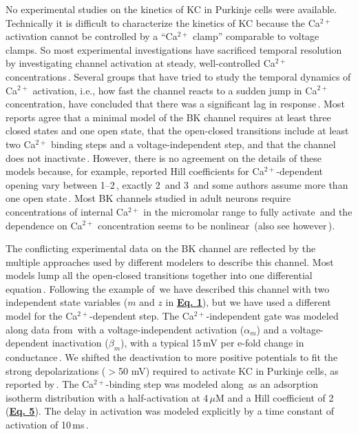 \documentclass[12pt]{article}
\begin{document}
No experimental studies on the kinetics of KC in Purkinje cells were available. Technically it is difficult to characterize the kinetics of KC because the Ca$^{2+}$ activation cannot be controlled by a ``Ca$^{2+}$ clamp'' comparable to voltage clamps. So most experimental investigations have sacrificed temporal resolution by investigating channel activation at steady, well-controlled Ca$^{2+}$ concentrations\,\cite{McManus:1898kl, Moczydlowski:1983qa, Smart:1987mi}. Several groups that have tried to study the temporal dynamics of Ca$^{2+}$ activation, i.e., how fast the channel reacts to a sudden jump in Ca$^{2+}$ concentration, have concluded that there was a significant lag in response\,\cite{Gola:1990pi, Hudspeth:1988ff, Ikemoto:1989lh, L:1989ff}. Most reports agree that a minimal model of the BK channel requires at least three closed states and one open state, that the open-closed transitions include at least two Ca$^{2+}$ binding steps and a voltage-independent step, and that the channel does not inactivate\,\cite{Gola:1990pi, Moczydlowski:1983qa, Smart:1987mi}. However, there is no agreement on the details of these models because, for example, reported Hill coefficients for Ca$^{2+}$-dependent opening vary between 1--2\,\cite{Franciolini:1988fu, Moczydlowski:1983qa}, exactly 2\,\cite{Hudspeth:1988ff, Reinhart1989:xe} and 3\,\cite{Ikemoto:1989lh} and some authors assume more than one open state\,\cite{McManus:1898kl, Smart:1987mi}. Most BK channels studied in adult neurons require concentrations of internal Ca$^{2+}$ in the micromolar range to fully activate\,\cite{Franciolini:1988fu, Lancaster:1991ye, Reinhart1989:xe, Smart:1987mi} and the dependence on Ca$^{2+}$ concentration seems to be nonlinear\,\cite{Franciolini:1988fu, Moczydlowski:1983qa} (also see however\,\cite{L:1989ff}).

The conflicting experimental data on the BK channel are reflected by the multiple approaches used by different modelers to describe this channel. Most models lump all the open-closed transitions together into one differential equation\,\cite{hines84:_effic, Moczydlowski:1983qa, D:1982lh, Yamada-W:1989bs}. Following the example of\,\cite{Traub-R-D:1991mi} we have described this channel with two independent state variables ($m$ and $z$ in \href{../pub-purkinje-deschutter1-equations1/pub-purkinje-deschutter1-equations1.tex}{\bf Eq. 1}), but we have used a different model for the Ca$^{2+}$-dependent step. The Ca$^{2+}$-independent gate was modeled along data from\,\cite{Gola:1990pi} with a voltage-independent activation ($\alpha_m$) and a voltage-dependent inactivation ($\beta_m$), with a typical 15\,mV per e-fold change in conductance\,\cite{Franciolini:1988fu, Latorre:1989fu}. We shifted the deactivation to more positive potentials to fit the strong depolarizations ($>$50 mV) required to activate KC in Purkinje cells, as reported by\,\cite{Gruol:1991dz}. The Ca$^{2+}$-binding step was modeled along\,\cite{Franciolini:1988fu} as an adsorption isotherm distribution with a half-activation at 4\,$\mu$M and a Hill coefficient of 2 (\href{../pub-purkinje-deschutter1-equations1/pub-purkinje-deschutter1-equations1.tex}{\bf Eq. 5}). The delay in activation was modeled explicitly by a time constant of activation of 10\,ms\,\cite{Gola:1990pi, Ikemoto:1989lh, L:1989ff}.



\end{document}
